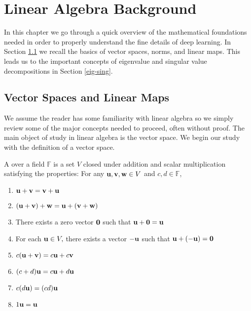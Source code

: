 
\chapter{Linear Algebra Background}


In this chapter we go through a quick overview of the mathematical foundations needed in order to properly understand the fine details of deep learning. In Section \ref{vec-spaces} we recall the basics of vector spaces, norms, and linear maps. This leads us to the important concepts of eigenvalue and singular value decompositions in Section \ref{eig-sing}. 


\section{Vector Spaces and Linear Maps}\label{vec-spaces}

We assume the reader has some familiarity with linear algebra so we simply review some of the major concepts needed to proceed, often without proof. The main object of study in linear algebra is the vector space. We begin our study with the definition of a vector space.

\begin{definition}
A  over a field $\mathbb F$ is a set $V$ closed under addition and scalar multiplication satisfying the properties: For any $\vu, \vv, \vw \in V$ and $c, d \in \mathbb F$,
\begin{enumerate}
\item $\vu + \vv = \vv + \vu$ 
\item $(\vu + \vv) + \vw = \vu + (\vv + \vw)$ 
\item There exists a zero vector $\vzero$ such that $\vu + \vzero = \vu$
\item For each $\vu \in V,$ there exists a vector $-\vu$ such that $\vu + (-\vu) = \vzero$
\item  $c(\vu + \vv) = c\vu + c\vv$
\item $(c+ d) \vu = c\vu + d\vu$
\item $c(d\vu) = (cd) \vu$
\item $1 \vu = \vu$
\end{enumerate}
\end{definition}

